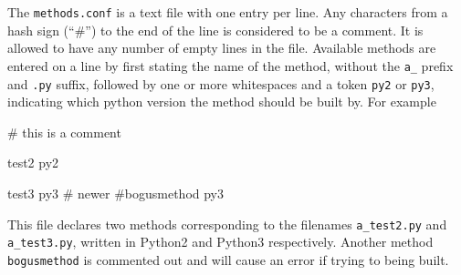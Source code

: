The \texttt{methods.conf} is a text file with one entry per line.  Any
characters from a hash sign (``\#'') to the end of the line is
considered to be a comment.  It is allowed to have any number of empty
lines in the file.  Available methods are entered on a line by first
stating the name of the method, without the \texttt{a\_} prefix
and \texttt{.py} suffix, followed by one or more whitespaces and a
token \texttt{py2} or \texttt{py3}, indicating which python version
the method should be built by.  For example
\begin{shell}
# this is a comment

test2     py2

test3     py3  # newer
#bogusmethod    py3
\end{shell}
This file declares two methods corresponding to the
filenames \texttt{a\_test2.py} and \texttt{a\_test3.py}, written in
Python2 and Python3 respectively.  Another method \texttt{bogusmethod}
is commented out and will cause an error if trying to being built.
